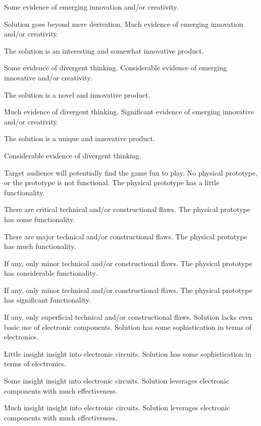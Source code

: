 \documentclass{../../fal_assignment}
\begin{document}
\begin{markingrubric}
	\grade Some evidence of emerging innovation and/or creativity.
	\par Solution goes beyond mere derivation.
	\grade Much evidence of emerging innovation and/or creativity.
	\par The solution is an interesting and somewhat innovative product.
	\par Some evidence of divergent thinking.
	\grade Considerable evidence of emerging innovative and/or creativity.
	\par The solution is a novel and innovative product.
	\par Much evidence of divergent thinking.
	\grade Significant evidence of emerging innovative and/or creativity.
	\par The solution is a unique and innovative product.
	\par Considerable evidence of divergent thinking.
	\par Target audience will potentially find the game fun to play.
	\grade\fail No physical prototype, or the prototype is not functional.
	\grade The physical prototype has a little functionality.
	\par There are critical technical and/or constructional flaws.
	\grade The physical prototype has some functionality.
	\par There are major technical and/or constructional flaws.
	\grade The physical prototype has much functionality.
	\par If any, only minor technical and/or constructional flaws.
	\grade The physical prototype has considerable functionality.
	\par If any, only minor technical and/or constructional flaws.
	\grade The physical prototype has significant functionality.
	\par If any, only superficial technical and/or constructional flaws.
	\grade\fail Solution lacks even basic use of electronic components.
	\grade Solution has some sophistication in terms of electronics.
	\par Little insight insight into electronic circuits.
	\grade Solution has some sophistication  in terms of electronics.
	\par Some insight insight into electronic circuits.
	\grade Solution leverages electronic components with much effectiveness.
	\par Much insight insight into electronic circuits.
	\grade Solution leverages electronic components with much effectiveness.

\end{markingrubric}
\end{document}
